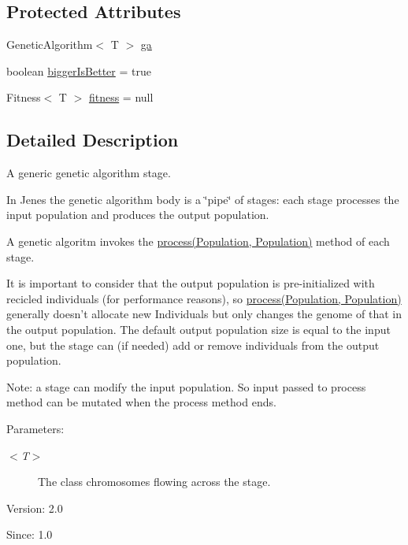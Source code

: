\subsection*{Protected Attributes}
\begin{CompactItemize}
\item 
GeneticAlgorithm$<$ T $>$ \hyperlink{classjenes_1_1stage_1_1_abstract_stage_3_01_t_01extends_01_chromosome_01_4_751aba4f46b29d22592d48422ffa75f9}{ga}
\item 
boolean \hyperlink{classjenes_1_1stage_1_1_abstract_stage_3_01_t_01extends_01_chromosome_01_4_11da35af3fe950eef9882b03e13690d4}{biggerIsBetter} = true
\item 
Fitness$<$ T $>$ \hyperlink{classjenes_1_1stage_1_1_abstract_stage_3_01_t_01extends_01_chromosome_01_4_697ab8239c1ae2a99445cd7f5fbca45d}{fitness} = null
\end{CompactItemize}


\subsection{Detailed Description}
A generic genetic algorithm stage.\par
 \par
 In Jenes the genetic algorithm body is a \char`\"{}pipe\char`\"{} of stages: each stage processes the input population and produces the output population.\par
 A genetic algoritm invokes the \hyperlink{}{process(Population, Population)} method of each stage. \par
 It is important to consider that the output population is pre-initialized with recicled individuals (for performance reasons), so \hyperlink{}{process(Population, Population)} generally doesn't allocate new Individuals but only changes the genome of that in the output population. The default output population size is equal to the input one, but the stage can (if needed) add or remove individuals from the output population. \par
\par
 Note: a stage can modify the input population. So input passed to process method can be mutated when the process method ends.

\begin{Desc}
\item[Parameters:]
\begin{description}
\item[{\em $<$T$>$}]The class chromosomes flowing across the stage.\end{description}
\end{Desc}
\begin{Desc}
\item[Version:]2.0 \end{Desc}
\begin{Desc}
\item[Since:]1.0 \end{Desc}


